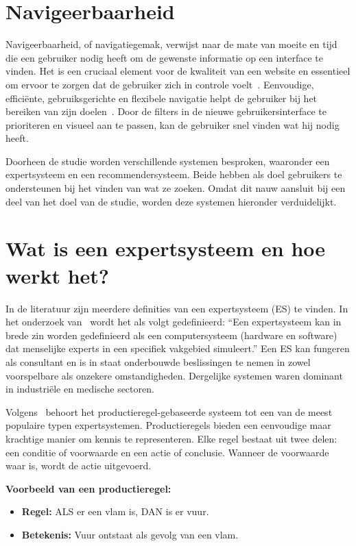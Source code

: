 \section{Navigeerbaarheid}
Navigeerbaarheid, of navigatiegemak, verwijst naar de mate van moeite en tijd die een gebruiker nodig heeft om de gewenste informatie op een interface te vinden. Het is een cruciaal element voor de kwaliteit van een website en essentieel om ervoor te zorgen dat de gebruiker zich in controle voelt~\autocite{Zachrison2022}. Eenvoudige, efficiënte, gebruiksgerichte en flexibele navigatie helpt de gebruiker bij het bereiken van zijn doelen~\autocite{Pearson2007}. Door de filters in de nieuwe gebruikersinterface te prioriteren en visueel aan te passen, kan de gebruiker snel vinden wat hij nodig heeft.\par
\bigskip
Doorheen de studie worden verschillende systemen besproken, waaronder een expertsysteem en een recommendersysteem. Beide hebben als doel gebruikers te ondersteunen bij het vinden van wat ze zoeken. Omdat dit nauw aansluit bij een deel van het doel van de studie, worden deze systemen hieronder verduidelijkt.

\section{Wat is een expertsysteem en hoe werkt het?}
In de literatuur zijn meerdere definities van een expertsysteem (ES) te vinden. In het onderzoek van~\textcite[2]{Castillo2012} wordt het als volgt gedefinieerd: “Een expertsysteem kan in brede zin worden gedefinieerd als een computersysteem (hardware en software) dat menselijke experts in een specifiek vakgebied simuleert.” Een ES kan fungeren als consultant en is in staat onderbouwde beslissingen te nemen in zowel voorspelbare als onzekere omstandigheden. Dergelijke systemen waren dominant in industriële en medische sectoren.

Volgens~\textcite{Erdani2012} behoort het productieregel-gebaseerde systeem tot een van de meest populaire typen expertsystemen. Productieregels bieden een eenvoudige maar krachtige manier om kennis te representeren. Elke regel bestaat uit twee delen: een conditie of voorwaarde en een actie of conclusie. Wanneer de voorwaarde waar is, wordt de actie uitgevoerd.\par
\medskip
\textbf{Voorbeeld van een productieregel:}
\begin{itemize}
    \item \textbf{Regel:} ALS er een vlam is, DAN is er vuur.
    \item \textbf{Betekenis:} Vuur ontstaat als gevolg van een vlam.
\end{itemize}

